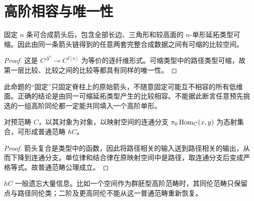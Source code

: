 \section{高阶相容与唯一性}
\begin{proposition}[较高合成数据的可缩性]
固定 $n$ 条可合成箭头后，包含全部长边、三角形和较高面的 $n$-单形延拓类型可缩。因此由同一条箭头链得到的任意两套完整合成数据之间有可缩的比较空间。
\end{proposition}
\begin{proof}
这是 $C^{\Delta^n}\to C^{I[n]}$ 为等价的逐纤维形式。可缩类型中的路径类型可缩，故第一层比较、比较之间的比较等都具有同样的唯一性。
\end{proof}
\begin{remark}
此命题的“固定”只固定脊柱上的原始箭头，不随意固定可能互不相容的所有低维面。正确的结论是由同一可缩延拓类型产生的比较相容。不能据此断言任意预先挑选的一组高阶同伦都一定能共同填入一个高阶单形。
\end{remark}
\begin{proposition}[同伦范畴]
对预范畴 $C$，以其对象为对象，以映射空间的连通分支 $\pi_0\operatorname{Hom}_C(x,y)$ 为态射集合，可形成普通范畴 $hC$。
\end{proposition}
\begin{proof}
箭头复合是类型中的函数，因此将路径相关的输入送到路径相关的输出，从而下降到连通分支。单位律和结合律在原映射空间中是路径，取连通分支后变成严格等式。故普通范畴公理成立。
\end{proof}
\begin{remark}
$hC$ 一般遗忘大量信息。比如一个空间作为群胚型高阶范畴时，其同伦范畴只保留点与路径同伦类；二阶及更高同伦不能从这一普通范畴重新恢复。
\end{remark}

